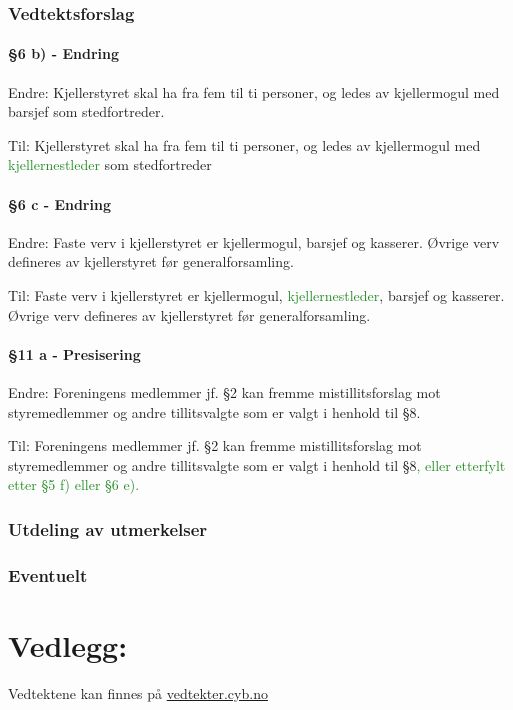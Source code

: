 \documentclass[10pt,norsk,a4paper,usenames,dvipsnames]{article}
\begin{document}
\newpage

\section{Vedtektsforslag}

    \subsection{§6 b) - Endring}
    Endre:
    Kjellerstyret skal ha fra fem til ti personer, og ledes av kjellermogul med \textcolor{BrickRed}{barsjef} som stedfortreder.

    Til:
    Kjellerstyret skal ha fra fem til ti personer, og ledes av kjellermogul med \textcolor{ForestGreen}{kjellernestleder} som stedfortreder


    \subsection{§6 c - Endring}
    Endre:
    Faste verv i kjellerstyret er kjellermogul, barsjef og kasserer. Øvrige verv defineres av kjellerstyret før generalforsamling.

    Til:
    Faste verv i kjellerstyret er kjellermogul, \textcolor{ForestGreen}{kjellernestleder}, barsjef og kasserer. Øvrige verv defineres av kjellerstyret før generalforsamling.


    \subsection{§11 a - Presisering}
    Endre:
    Foreningens medlemmer jf. §2 kan fremme mistillitsforslag mot styremedlemmer og andre tillitsvalgte som er valgt i henhold til §8.

    Til:
    Foreningens medlemmer jf. §2 kan fremme mistillitsforslag mot styremedlemmer og andre tillitsvalgte som er valgt i henhold til §8\textcolor{ForestGreen}{, eller etterfylt etter §5 f) eller §6 e).}



\section{Utdeling av utmerkelser}


\section{Eventuelt}


\part*{Vedlegg:}\label{lastpage}

    \centering\huge Vedtektene kan finnes på \href{vedtekter.cyb.no}{vedtekter.cyb.no}


% 
\end{document}
